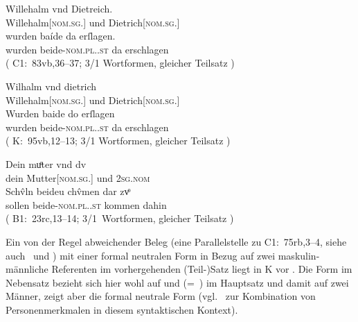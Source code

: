 \begin{exe}
\ex \label{ex:dietwill2} %
	\begin{xlist}
	\ex \label{ex:dietwill2_2}
		\gll Willehalm vnd Dietreich. \\
			Willehalm[\textsc{nom.sg.\MascM}] und
				Dietrich[\textsc{nom.sg.\MascM}] \\
	\sn \gll wurden baíde da erſlagen. \\
			wurden beide-\textsc{nom.pl.\MascM.st} da erschlagen \\
		\trans {}
			(%
				C1:~83vb,36--37;
				3/1 Wortformen, gleicher Teilsatz%
			)

	\ex \label{ex:dietwill2_3}
		\gll Wilhalm vnd dietrich \\
			Willehalm[\textsc{nom.sg.\MascM}] und
				Dietrich[\textsc{nom.sg.\MascM}] \\
	\sn \gll Wurden baide do erſlagen \\
			wurden beide-\textsc{nom.pl.\MascM.st} da erschlagen \\
		\trans {}
			(%
				K:~95vb,12--13;
				3/1 Wortformen, gleicher Teilsatz%
			)
	\end{xlist}

\ex \label{ex:mutterdu2}
	\gll Dein muͦter vnd dv \\
		dein Mutter[\textsc{nom.sg.\FemF}] und \textsc{2sg\subM.nom} \\
\sn \gll Schv̂ln beideu chv̂men {dar zvͦ} \\
		sollen beide-\textsc{nom.pl.\NeutMF.st} kommen dahin \\
	\trans {}
		(%
			B1:~23rc,13--14;
			3/1~Wortformen, gleicher Teilsatz%
		)
\end{exe}

\label{phsec:baideuwarn3}
Ein von der Regel abweichender Beleg
(eine Parallelstelle zu C1:~75rb,3--4, siehe
auch~ und
) mit einer formal neutralen Form in Bezug auf zwei
maskulin-männ\-liche Referenten im vorhergehenden (Teil-)Satz liegt in K vor
. Die Form   im Nebensatz bezieht
sich hier wohl auf   und  
(=~) im Hauptsatz und damit auf zwei Männer, zeigt aber die formal
neutrale Form (vgl.~ zur Kombination von
Personenmerkmalen in diesem syntaktischen Kontext).

